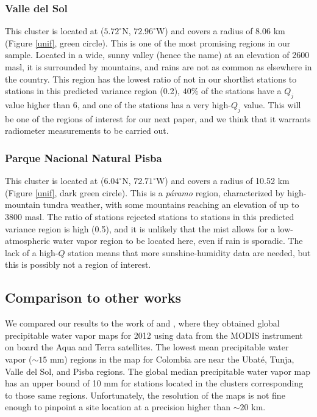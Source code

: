 \documentclass[a4paper,fleqn,usenatbib]{mnras}
\begin{document}
\subsubsection{Valle del Sol}

This cluster is located at ($5.72^\circ$N, $72.96^\circ$W) and covers a radius of 8.06 km (Figure \ref{unif}, green circle). This is one of the most promising regions in our sample. Located in a wide, sunny valley (hence the name) at an elevation of 2600 masl, it is surrounded by mountains, and rains are not as common as elsewhere in the country. This region has the lowest ratio of not in our shortlist stations to stations in this predicted variance region (0.2), $40\%$ of the stations have a $Q_j$ value higher than 6, and one of the stations has a very high-$Q_j$ value. This will be one of the regions of interest for our next paper, and we think that it warrants radiometer measurements to be carried out.

\subsubsection{Parque Nacional Natural Pisba}

This cluster is located at ($6.04^\circ$N, $72.71^\circ$W) and covers a radius of 10.52 km (Figure \ref{unif}, dark green circle). This is a \emph{p\'aramo} region, characterized by high-mountain tundra weather, with some mountains reaching an elevation of up to 3800 masl. The ratio of stations rejected stations to stations in this predicted variance region is high (0.5), and it is unlikely that the mist allows for a low-atmospheric water vapor region to be located here, even if rain is sporadic. The lack of a high-$Q$ station means that more sunshine-humidity data are needed, but this is possibly not a region of interest.

\subsection{Comparison to other works}

We compared our results to the work of  \citet{suen2014} and \citet{suen2016}, where they obtained global precipitable water vapor maps for 2012 using data from the MODIS instrument on board the Aqua and Terra satellites. The lowest mean precipitable water vapor ($\sim15$ mm) regions in the \citet{suen2014} map for Colombia are near the Ubat\'e, Tunja, Valle del Sol, and Pisba regions. The \citet{suen2016} global median precipitable water vapor map has an upper bound of 10 mm for stations located in the clusters corresponding to those same regions. Unfortunately, the resolution of the maps is not fine enough to pinpoint a site location at a precision higher than $\sim20$ km. 
\end{document}
